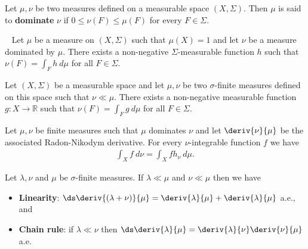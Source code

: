     \begin{definition}
            Let $\mu, \nu$ be two measures defined on a measurable space $(X, \Sigma)$. Then $\mu$ is said to \textbf{dominate} $\nu$ if $0\leq\nu(F)\leq\mu(F)$ for every $F\in\Sigma$.
    \end{definition}

    \begin{theorem}~\newline
        Let $\mu$ be a measure on $(X, \Sigma)$ such that $\mu(X) = 1$ and let $\nu$ be a measure dominated by $\mu$. There exists a non-negative $\Sigma$-measurable function $h$ such that $\nu(F) = \int_F h\ d\mu$ for all $F\in\Sigma$.
    \end{theorem}


    \begin{theorem}
        Let $(X,\Sigma)$ be a measurable space and let $\mu,\nu$ be two $\sigma$-finite measures defined on this space such that $\nu\ll\mu$. There exists a non-negative measurable function $g:X\rightarrow\mathbb{R}$ such that $\nu(F) = \int_F g\ d\mu$ for all $F\in\Sigma$.
    \end{theorem}

    \begin{property}
        Let $\mu, \nu$ be finite measures such that $\mu$ dominates $\nu$ and let $\deriv{\nu}{\mu}$ be the associated Radon-Nikodym derivative. For every $\nu$-integrable function $f$ we have
        \begin{gather}
            \int_X f\ d\nu = \int_X fh_\nu\ d\mu.
        \end{gather}
    \end{property}

    \begin{property}
        Let $\lambda,\nu$ and $\mu$ be $\sigma$-finite measures. If $\lambda\ll\mu$ and $\nu\ll\mu$ then we have
        \begin{itemize}
            \item \textbf{Linearity}: $\ds\deriv{(\lambda+\nu)}{\mu} = \deriv{\lambda}{\mu} + \deriv{\lambda}{\mu}$ a.e., and
            \item \textbf{Chain rule}: if $\lambda\ll\nu$ then $\ds\deriv{\lambda}{\mu} = \deriv{\lambda}{\nu}\deriv{\nu}{\mu}$ a.e.
        \end{itemize}
    \end{property}
